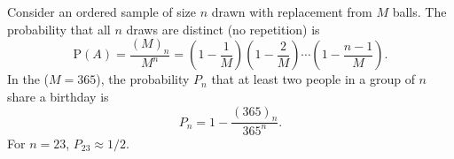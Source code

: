 Consider an ordered sample of size $n$ drawn with replacement from $M$ balls. The probability that all $n$ draws are distinct (no repetition) is
$$\text{P}(A) = \frac{(M)_n}{M^n} = \left(1 - \frac{1}{M}\right)\left(1 - \frac{2}{M}\right) \cdots \left(1 - \frac{n-1}{M}\right).$$
In the  ($M = 365$), the probability $P_n$ that at least two people in a group of $n$ share a birthday is
$$P_n = 1 - \frac{(365)_n}{365^n}.$$
For $n = 23$, $P_{23} \approx 1/2$.
